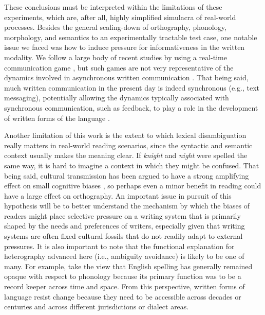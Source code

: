 \documentclass[doc,biblatex]{apa7}
\newcommand\firstrevision[1]{\textcolor{black}{#1}}
\begin{document}
These conclusions must be interpreted within the limitations of these experiments, which are, after all, highly simplified simulacra of real-world processes. Besides the general scaling-down of orthography, phonology, morphology, and semantics to an experimentally tractable test case, one notable issue we faced was how to induce pressure for informativeness in the written modality. We follow a large body of recent studies by using a real-time communication game \parencite[e.g.,][]{Carr:2017, Kanwal:2017, Kirby:2015, Raviv:2018, Saldana:2019, Silvey:2019, Winters:2015}, but such games are not very representative of the dynamics involved in asynchronous written communication \parencite[although see][for some approaches]{Winters:2019}. That being said, much written communication in the present day is indeed synchronous (e.g., text messaging), potentially allowing the dynamics typically associated with synchronous communication, such as feedback, to play a role in the development of written forms of the language \parencite{Lupyan:2016}.

Another limitation of this work is the extent to which lexical disambiguation really matters in real-world reading scenarios, since the syntactic and semantic context usually makes the meaning clear. If \textit{knight} and \textit{night} were spelled the same way, it is hard to imagine a context in which they might be confused. That being said, cultural transmission has been argued to have a strong amplifying effect on small cognitive biases \parencite{Thompson:2016}, so perhaps even a minor benefit in reading could have a large effect on orthography. An important issue in pursuit of this hypothesis will be to better understand the mechanism by which the biases of readers might place selective pressure on a writing system that is primarily shaped by the needs and preferences of writers, \firstrevision{especially given that writing systems are often fixed cultural fossils that do not readily adapt to external pressures.} It is also important to note that the functional explanation for heterography advanced here (i.e., ambiguity avoidance) is likely to be one of many. For example, \textcite{Stenroos:2016} take the view that English spelling has generally remained opaque with respect to phonology because its primary function was to be a record keeper across time and space. From this perspective, written forms of language resist change because they need to be accessible across decades or centuries and across different jurisdictions or dialect areas.
\end{document}
